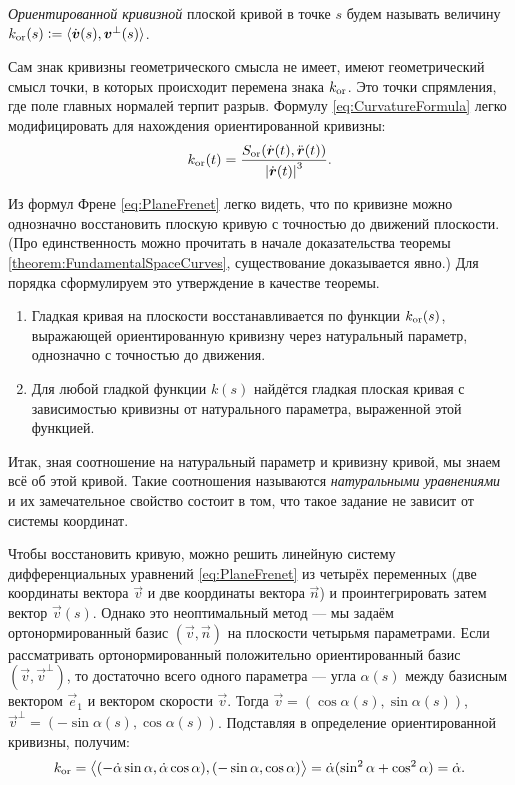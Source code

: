 \begin{definition}
	\textit{Ориентированной кривизной} плоской кривой в точке $s$ будем называть величину $k_{\mathrm{or}}(s) \vcentcolon = \langle\dot{\boldsymbol{v}}(s), \boldsymbol{v}^\perp(s)\rangle$.
\end{definition}

Сам знак кривизны геометрического смысла не имеет, имеют геометрический смысл точки, в которых происходит перемена знака $k_{\mathrm{or}}$. Это точки спрямления, где поле главных нормалей терпит разрыв. Формулу \eqref{eq:CurvatureFormula} легко модифицировать для нахождения ориентированной кривизны:
\begin{equation} \label{eq:OrientedCurvature}
	k_{\mathrm{or}}(t) = \frac{S_{\mathrm{or}}(\dot{\boldsymbol{r}}(t), \ddot{\boldsymbol{r}}(t))}{\left\lvert\dot{\boldsymbol{r}}(t)\right\rvert^3}.
\end{equation}

Из формул Френе \eqref{eq:PlaneFrenet} легко видеть, что по кривизне можно однозначно восстановить плоскую кривую с точностью до движений плоскости. (Про единственность можно прочитать в начале доказательства теоремы \ref{theorem:FundamentalSpaceCurves}, существование доказывается явно.) Для порядка сформулируем это утверждение в качестве теоремы.

\begin{theorem} \label{theorem:FundamentalPlaneCurves}
	\begin{enumerate}[nolistsep, label=(\arabic*)]
		\item Гладкая кривая на плоскости восстанавливается по функции $k_{\mathrm{or}}(s)$, выражающей ориентированную кривизну через натуральный параметр, однозначно с точностью до движения.
		\item Для любой гладкой функции $k(s)$ найдётся гладкая плоская кривая с зависимостью кривизны от натурального параметра, выраженной этой функцией.
	\end{enumerate}
\end{theorem}

Итак, зная соотношение на натуральный параметр и кривизну кривой, мы знаем всё об этой кривой. Такие соотношения называются \textit{натуральными уравнениями} и их замечательное свойство состоит в том, что такое задание не зависит от системы координат.

Чтобы восстановить кривую, можно решить линейную систему дифференциальных уравнений \eqref{eq:PlaneFrenet} из четырёх переменных (две координаты вектора $\vec{v}$ и две координаты вектора $\vec{n}$) и проинтегрировать затем вектор $\vec{v}(s)$. Однако это неоптимальный метод --- мы задаём ортонормированный базис $(\vec{v}, \vec{n})$ на плоскости четырьмя параметрами. Если рассматривать ортонормированный положительно ориентированный базис $(\vec{v}, \vec{v}^{\perp})$, то достаточно всего одного параметра --- угла $\alpha(s)$ между базисным вектором $\vec{e}_1$ и вектором скорости $\vec{v}$. Тогда $\vec{v} = (\cos\alpha(s), \sin\alpha(s))$, $\vec{v}^\perp = (-\sin\alpha(s), \cos\alpha(s))$. Подставляя в определение ориентированной кривизны, получим:
\[
	k_{\mathrm{or}} = \big\langle(-\dot{\alpha}\sin\alpha, \dot{\alpha}\cos\alpha), (-\sin\alpha, \cos\alpha)\big\rangle = \dot{\alpha}(\sin^2\alpha + \cos^2\alpha) = \dot{\alpha}.
\]

